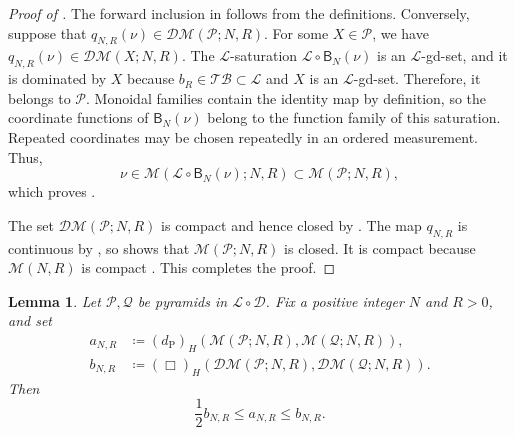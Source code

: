 \documentclass{amsart}
\theoremstyle{plain}
\newtheorem{lemma}[theorem]{Lemma}
\theoremstyle{definition}
\theoremstyle{remark}
\newcommand{\D}{\mathcal{D}}
\newcommand{\M}{\mathcal{M}}
\newcommand{\DM}{\mathcal{DM}}
\renewcommand{\L}{\mathcal{L}}
\newcommand{\TB}{\mathcal{TB}}
\newcommand{\dpr}{d_{\operatorname{P}}}
\newcommand{\haus}[1]{\left(#1\right)_H}
\begin{document}
\begin{proof}[Proof of ]
The forward inclusion in  follows from the definitions. Conversely, suppose that $q_{N,R}(\nu)\in\DM(\mathcal P;N,R)$. For some $X\in\mathcal P$, we have $q_{N,R}(\nu)\in\DM(X;N,R)$. The $\L$-saturation $\L\circ\mathsf B_N(\nu)$ is an $\L$-gd-set, and it is dominated by $X$ because $b_R\in\TB\subset\L$ and $X$ is an $\L$-gd-set. Therefore, it belongs to $\mathcal P$. Monoidal families contain the identity map by definition, so the coordinate functions of $\mathsf B_N(\nu)$ belong to the function family of this saturation. Repeated coordinates may be chosen repeatedly in an ordered measurement. Thus,
\[
\nu\in\M(\L\circ\mathsf B_N(\nu);N,R)
\subset\M(\mathcal P;N,R),
\]
which proves .

The set $\DM(\mathcal P;N,R)$ is compact and hence closed by \cite[Lemma~7.1]{gds2}. The map $q_{N,R}$ is continuous by , so  shows that $\M(\mathcal P;N,R)$ is closed. It is compact because $\M(N,R)$ is compact \cite[Lemma~1.17(3) and Definition~5.37]{shioya2016mmg}. This completes the proof.
\end{proof}

\begin{lemma}
\label{lem:l-ordered-feature-bilipschitz}
Let $\mathcal P,\mathcal Q$ be pyramids in $\L\circ\D$. Fix a positive integer $N$ and $R>0$, and set
\[
\begin{aligned}
a_{N,R}&\coloneqq\haus{\dpr}(\M(\mathcal P;N,R),\M(\mathcal Q;N,R)),\\
b_{N,R}&\coloneqq\haus{\Box}(\DM(\mathcal P;N,R),\DM(\mathcal Q;N,R)).
\end{aligned}
\]
Then
\[\frac12b_{N,R}\leq a_{N,R}\leq b_{N,R}.\]
\end{lemma}
\end{document}

